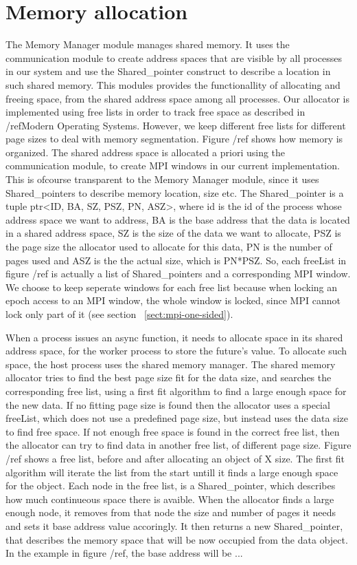 \section{Memory allocation}
The Memory Manager module manages shared memory. It uses the communication module to create address spaces that
are visible by all processes in our system and use the Shared\_pointer construct to describe a location in such
shared memory.  This modules provides the functionallity of allocating and freeing space, from the shared address 
space among all processes.  Our allocator is implemented using free lists in order to track free space as 
described in /refModern Operating Systems.  However, we keep different free lists for different page sizes to deal
with memory segmentation.  Figure /ref shows how memory is organized.  The shared address space is allocated a priori
using the communication module, to create MPI windows in our current implementation.  This is ofcourse transparent to
the Memory Manager module, since it uses Shared\_pointers to describe memory location, size etc.  
The Shared\_pointer is a tuple  ptr<ID, BA, SZ, PSZ, PN, ASZ>, where id is the id of the process
whose address space we want to address, BA is the base address that the data is located in a shared address space,
SZ is the size of the data we want to allocate, PSZ is the page size the allocator used to allocate for this data,
PN is the number of pages used and ASZ is the the actual size, which is PN*PSZ.   
So, each freeList in figure /ref is actually a list of Shared\_pointers and a corresponding MPI window.  We choose
to keep seperate windows for each free list because when locking an epoch access to an MPI window, the whole 
window is locked, since MPI cannot lock only part of it (see section ~\ref{sect:mpi-one-sided}).  


When a process issues an async function, it needs to allocate space in its shared address space, for the worker process to store the future's value.  To allocate such space, the host process uses the shared memory manager. 
The shared memory allocator tries to find the best page size
fit for the data size, and searches the corresponding free list, using a first fit algorithm to find a large 
enough space for the new data. If no fitting page size is found then the allocator uses a special freeList, 
which does not use a predefined page size, but instead uses the data size to find free space.  If not enough free
space is found in the correct free list, then the allocator can try to find data in another free list, of different
page size.  Figure /ref shows a free list, before and after allocating an object of X size.  The first fit algorithm
will iterate the list from the start untill it finds a large enough space for the object.  Each node in the free list,
is a Shared\_pointer, which describes how much continueous space there is avaible.  When the allocator finds a large
enough node, it removes from that node the size and number of pages it needs and sets it base address value accoringly.
It then returns a new Shared\_pointer, that describes the memory space that will be now occupied from the data object.
In the example in figure /ref, the base address will be ...


